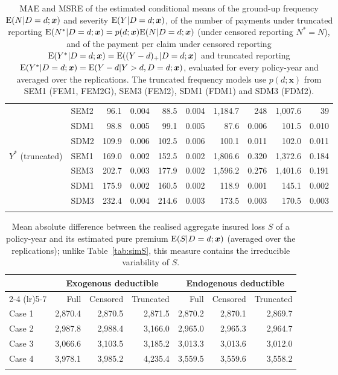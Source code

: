 \documentclass[11pt]{article}
\begin{document}
\begin{table}[!ht]
{{\begin{tabular}{llrrrrrrrr}
 & SEM2 & 96.1 & 0.004 & 88.5 & 0.004 & 1,184.7 & 248 & 1,007.6 & 39 \\
 & SDM1 & 98.8 & 0.005 & 99.1 & 0.005 & 87.6 & 0.006 & 101.5 & 0.010 \\
 & SDM2 & 109.9 & 0.006 & 102.5 & 0.006 & 100.1 & 0.011 & 102.0 & 0.011 \\
\midrule
\multirow{4}{*}{$Y^*$ (truncated)} & SEM1 & 169.0 & 0.002 & 152.5 & 0.002 & 1,806.6 & 0.320 & 1,372.6 & 0.184 \\
 & SEM3 & 202.7 & 0.003 & 177.9 & 0.002 & 1,596.2 & 0.276 & 1,401.6 & 0.191 \\
 & SDM1 & 175.9 & 0.002 & 160.5 & 0.002 & 118.9 & 0.001 & 145.1 & 0.002 \\
 & SDM3 & 232.4 & 0.004 & 214.6 & 0.003 & 173.5 & 0.003 & 170.5 & 0.003 \\
\hhline{==========}
\end{tabular}
}
}
\caption{MAE and MSRE of the estimated conditional means of the ground-up frequency ${\rm E}(N|D=d;\bm{x})$ and severity ${\rm E}(Y|D=d;\bm{x})$, of the number of payments under truncated reporting ${\rm E}(N^*|D=d;\bm{x})=p(d;\bm{x}){\rm E}(N|D=d;\bm{x})$ (under censored reporting $N^*=N$), and of the payment per claim under censored reporting ${\rm E}(Y^*|D=d;\bm{x})={\rm E}((Y-d)_+|D=d;\bm{x})$ and truncated reporting ${\rm E}(Y^*|D=d;\bm{x})={\rm E}(Y-d|Y>d,D=d;\bm{x})$, evaluated for every policy-year and averaged over the replications. The truncated frequency models use $p(d;\bm{x})$ from SEM1 (FEM1, FEM2G), SEM3 (FEM2), SDM1 (FDM1) and SDM3 (FDM2).}\label{tab:AppSimComponents}
\end{table}

\begin{table}[!ht]
\footnotesize
\centering
{\color{blue}
\begin{tabular}{lrrrrrr}
\toprule
 & \multicolumn{3}{c}{Exogenous deductible} & \multicolumn{3}{c}{Endogenous deductible} \\
\cmidrule(lr){2-4} \cmidrule(lr){5-7}
 & Full & Censored & Truncated & Full & Censored & Truncated \\
\midrule
Case 1 & 2,870.4 & 2,870.5 & 2,871.5 & 2,870.2 & 2,870.1 & 2,869.7 \\
Case 2 & 2,987.8 & 2,988.4 & 3,166.0 & 2,965.0 & 2,965.3 & 2,964.7 \\
Case 3 & 3,066.6 & 3,103.5 & 3,185.2 & 3,013.3 & 3,013.6 & 3,012.0 \\
Case 4 & 3,978.1 & 3,985.2 & 4,235.4 & 3,559.5 & 3,559.6 & 3,558.2 \\
\hhline{=======}
\end{tabular}
}
\caption{Mean absolute difference between the realised aggregate insured loss $S$ of a policy-year and its estimated pure premium ${\rm E}(S|D=d;\bm{x})$ (averaged over the replications); unlike Table~\ref{tab:simS}, this measure contains the irreducible variability of $S$.}\label{tab:AppSimSobs}
\end{table}
\end{document}
